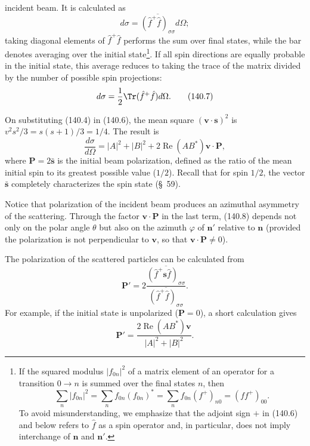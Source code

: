 incident beam. It is calculated as
\begin{equation}
 d\sigma=\overline{(\hat f^+\hat f)_{\sigma\sigma}}d\Omega;
 \tag{140.6}
\end{equation}
taking diagonal elements of $\hat f^+\hat f$ performs the sum over final
states, while the bar denotes averaging over the initial
state\footnote{If the squared modulus $|f_{0n}|^2$ of a matrix element of an
operator for a transition $0\to n$ is summed over the final states $n$, then
\[
 \sum_n|f_{0n}|^2=\sum_nf_{0n}(f_{0n})^*=\sum_nf_{0n}(f^+)_{n0}=(ff^+)_{00}.
\]
To avoid misunderstanding, we emphasize that the adjoint sign $+$ in (140.6)
and below refers to $\hat f$ as a spin operator and, in particular, does not
imply interchange of $\mathbf n$ and $\mathbf n'$.}. If all spin directions
are equally probable in the initial state, this average reduces to taking the
trace of the matrix divided by the number of possible spin projections:
\begin{equation}
 d\sigma=\frac12\Tr(\hat f^+\hat f)d\Omega.
 \tag{140.7}
\end{equation}

On substituting (140.4) in (140.6), the mean square
$(\mathbf v\cdot\mathbf s)^2$ is
$v^2s^2/3=s(s+1)/3=1/4$. The result is
\begin{equation}
 \frac{d\sigma}{d\Omega}=|A|^2+|B|^2
 +2\operatorname{Re}(AB^*)\mathbf v\cdot\mathbf P,
 \tag{140.8}
\end{equation}
where $\mathbf P=2\bar{\mathbf s}$ is the initial beam polarization, defined
as the ratio of the mean initial spin to its greatest possible value
($1/2$). Recall that for spin $1/2$, the vector $\bar{\mathbf s}$ completely
characterizes the spin state (\S~59).

Notice that polarization of the incident beam produces an azimuthal asymmetry
of the scattering. Through the factor $\mathbf v\cdot\mathbf P$ in the last
term, (140.8) depends not only on the polar angle $\theta$ but also on the
azimuth $\varphi$ of $\mathbf n'$ relative to $\mathbf n$ (provided the
polarization is not perpendicular to $\mathbf v$, so that
$\mathbf v\cdot\mathbf P\ne0$).

The polarization of the scattered particles can be calculated from
\begin{equation}
 \mathbf P'=2\frac{\overline{(\hat f^+\mathbf s\hat f)_{\sigma\sigma}}}
 {\overline{(\hat f^+\hat f)_{\sigma\sigma}}}.
 \tag{140.9}
\end{equation}
For example, if the initial state is unpolarized ($\mathbf P=0$), a short
calculation gives
\begin{equation}
 \mathbf P'=\frac{2\operatorname{Re}(AB^*)\mathbf v}{|A|^2+|B|^2}.
 \tag{140.10}
\end{equation}

